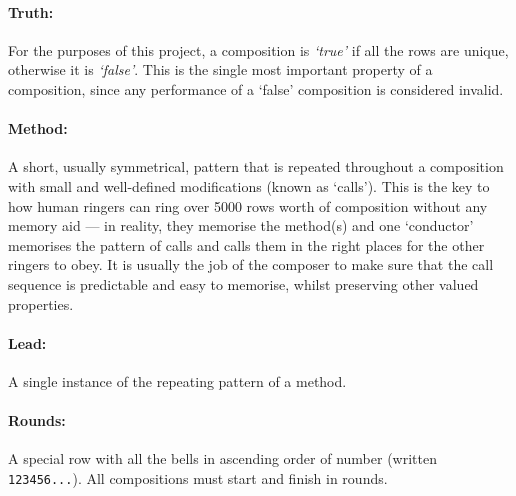 \documentclass[12pt]{article}
\begin{document}
\paragraph{Truth:} For the purposes of this project, a composition is \emph{`true'} if all the rows
are unique, otherwise it is \emph{`false'}.  This is the single most important property of a
composition, since any performance of a `false' composition is considered invalid.

\paragraph{Method:} A short, usually symmetrical, pattern that is repeated throughout a composition
with small and well-defined modifications (known as `calls').  This is the key to how human ringers
can ring over 5000 rows worth of composition without any memory aid --- in reality, they memorise
the method(s) and one `conductor' memorises the pattern of calls and calls them in the right places
for the other ringers to obey.  It is usually the job of the composer to make sure that the call
sequence is predictable and easy to memorise, whilst preserving other valued properties.

\paragraph{Lead:} A single instance of the repeating pattern of a method.

\paragraph{Rounds:} A special row with all the bells in ascending order of number (written
\verb|123456...|).  All compositions must start and finish in rounds.
\end{document}

